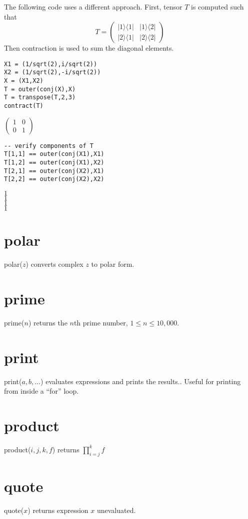 \bigskip
The following code uses a different approach.
First, tensor $T$ is computed such that
\[
T=\begin{pmatrix}
|1\rangle\langle1| & |1\rangle\langle2| \\
|2\rangle\langle1| & |2\rangle\langle2|
\end{pmatrix}
\]
Then contraction is used to sum the diagonal elements.
\begin{Verbatim}[formatcom=\color{blue}]
X1 = (1/sqrt(2),i/sqrt(2))
X2 = (1/sqrt(2),-i/sqrt(2))
X = (X1,X2)
T = outer(conj(X),X)
T = transpose(T,2,3)
contract(T)
\end{Verbatim}
$\displaystyle
\begin{pmatrix}
1 & 0\\
0 & 1
\end{pmatrix}
$
\begin{Verbatim}[formatcom=\color{blue}]
-- verify components of T
T[1,1] == outer(conj(X1),X1)
T[1,2] == outer(conj(X1),X2)
T[2,1] == outer(conj(X2),X1)
T[2,2] == outer(conj(X2),X2)
\end{Verbatim}
$1$\\
$1$\\
$1$\\
$1$

\section*{polar}
polar($z$) converts complex $z$ to polar form.

\section*{prime}
prime($n$) returns the $n$th prime number, $1\le n\le10{,}000$.

\section*{print}
print($a,b,\ldots$) evaluates expressions and prints the results..
Useful for printing from inside a ``for'' loop.

\section*{product}
product($i,j,k,f$) returns $\displaystyle\prod_{i=j}^k f$

\section*{quote}
quote($x$) returns expression $x$ unevaluated.

